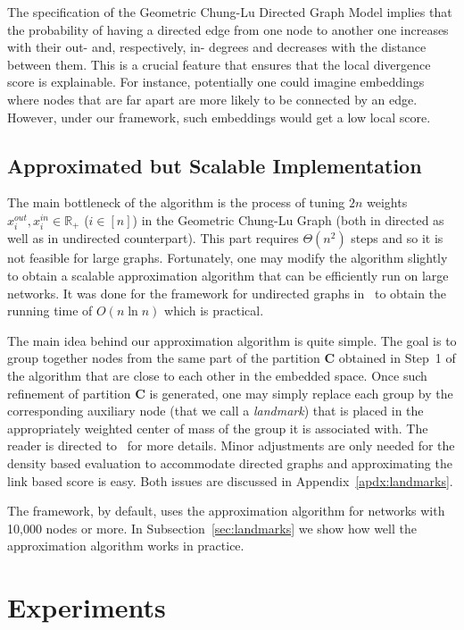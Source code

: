 \documentclass[11pt]{article}
\newcommand{\R}{{\mathbb R}}
\begin{document}
 The specification of the Geometric Chung-Lu Directed Graph Model implies that the probability of having a directed edge from one node to another one increases with their out- and, respectively, in- degrees and decreases with the distance between them. This is a crucial feature that ensures that the local divergence score is explainable. For instance, potentially one could imagine embeddings where nodes that are far apart are more likely to be connected by an edge. However, under our framework, such embeddings would get a low local score.

\subsection{Approximated but Scalable Implementation}\label{sec:scalable}

The main bottleneck of the algorithm is the process of tuning $2n$ weights $x_i^{out}, x_i^{in} \in \R_+$ ($i \in [n]$) in the Geometric Chung-Lu Graph (both in directed as well as in undirected counterpart). This part requires $\Theta(n^2)$ steps and so it is not feasible for large graphs. Fortunately, one may modify the algorithm slightly to obtain a scalable approximation algorithm that can be efficiently run on large networks. It was done for the framework for undirected graphs in~\cite{Embedding_Complex_Networks_Scalable} to obtain the running time of $O(n \ln n)$ which is practical.

The main idea behind our approximation algorithm is quite simple. The goal is to group together nodes from the same part of the partition $\textbf{C}$ obtained in Step~1 of the algorithm that are close to each other in the embedded space. Once such refinement of partition $\textbf{C}$ is generated, one may simply replace each group by the corresponding auxiliary node (that we call a \emph{landmark}) that is placed in the appropriately weighted center of mass of the group it is associated with. The reader is directed to~\cite{Embedding_Complex_Networks_Scalable} for more details. Minor adjustments are only needed for the density based evaluation to accommodate directed graphs and approximating the link based score is easy. Both issues are discussed in Appendix~\ref{apdx:landmarks}.

The framework, by default, uses the approximation algorithm for networks with 10,000 nodes or more. In Subsection~\ref{sec:landmarks} we show how well the approximation algorithm works in practice.

\section{Experiments}\label{sec:experiments}
\end{document}
